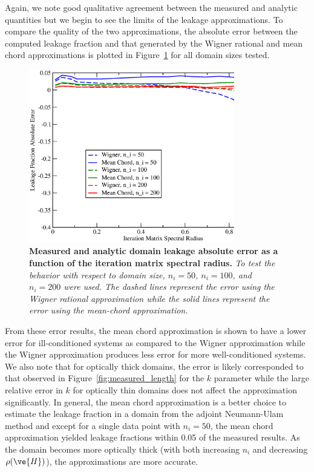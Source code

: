\documentclass[preprint,11pt]{elsarticle}
\begin{document}
Again, we note good qualitative agreement between the measured and
analytic quantities but we begin to see the limits of the leakage
approximations. To compare the quality of the two approximations, the
absolute error between the computed leakage fraction and that
generated by the Wigner rational and mean chord approximations is
plotted in Figure~\ref{fig:leakage_error} for all domain sizes
tested. 
\begin{figure}[ht!]
  \begin{center}
    \includegraphics[width=0.8\textwidth]{leakage_error.eps}
  \end{center}
  \caption{\textbf{Measured and analytic domain leakage absolute error as a
      function of the iteration matrix spectral radius.} \textit{To test the
      behavior with respect to domain size, $n_i=50$, $n_i=100$, and $n_i=200$
      were used. The dashed lines represent the error using the Wigner
      rational approximation while the solid lines represent the error using
      the mean-chord approximation.}}
  \label{fig:leakage_error}
\end{figure}
From these error results, the mean chord approximation is shown to have a
lower error for ill-conditioned systems as compared to the Wigner
approximation while the Wigner approximation produces less error for more
well-conditioned systems. We also note that for optically thick domains, the
error is likely corresponded to that observed in
Figure~\ref{fig:measured_length} for the $k$ parameter while the large
relative error in $k$ for optically thin domains does not affect the
approximation significantly. In general, the mean chord approximation is a
better choice to estimate the leakage fraction in a domain from the adjoint
Neumann-Ulam method and except for a single data point with $n_i=50$, the mean
chord approximation yielded leakage fractions within 0.05 of the measured
results. As the domain becomes more optically thick (with both increasing
$n_i$ and decreasing $\rho(\ve{H})$), the approximations are more accurate.
\end{document}
